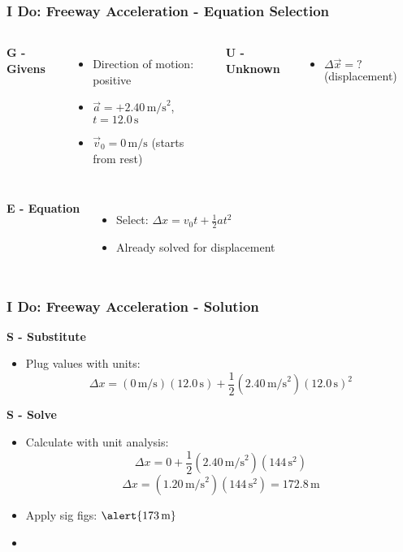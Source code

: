 \documentclass{beamer}
\begin{document}
\begin{frame}
\frametitle{I Do: Freeway Acceleration - Equation Selection}
\begin{columns}[T]
\textbf{G - Givens}
\begin{itemize}
\item Direction of motion: positive
\item $\vec{a} = +2.40 \, \text{m/s}^2$, $t = 12.0 \, \text{s}$
\item $\vec{v}_0 = 0 \, \text{m/s}$ (starts from rest)
\end{itemize}
\pause
{}
\textbf{U - Unknown}
\begin{itemize}
\item $\Delta \vec{x} = ?$ (displacement)
\end{itemize}
\end{columns}
\pause
\begin{columns}[T]
\textbf{E - Equation}
\begin{itemize}
\item Select: $\Delta x = v_0 t + \frac{1}{2}at^2$
\item Already solved for displacement
\end{itemize}
\end{columns}
\end{frame}

\begin{frame}
\frametitle{I Do: Freeway Acceleration - Solution}
\textbf{S - Substitute}
\begin{itemize}
\item Plug values with units:
\[ \Delta x = (0 \, \text{m/s})(12.0 \, \text{s}) + \frac{1}{2}(2.40 \, \text{m/s}^2)(12.0 \, \text{s})^2 \]
\end{itemize}
\pause
\textbf{S - Solve}
\begin{itemize}
\item Calculate with unit analysis:
\[ \Delta x = 0 + \frac{1}{2}(2.40 \, \text{m/s}^2)(144 \, \text{s}^2) \]
\[ \Delta x = (1.20 \, \text{m/s}^2)(144 \, \text{s}^2) = 172.8 \, \text{m} \]
\item Apply sig figs: $\alert{173 \, \text{m}}$
\item {}
\end{itemize}
\end{frame}
\end{document}
